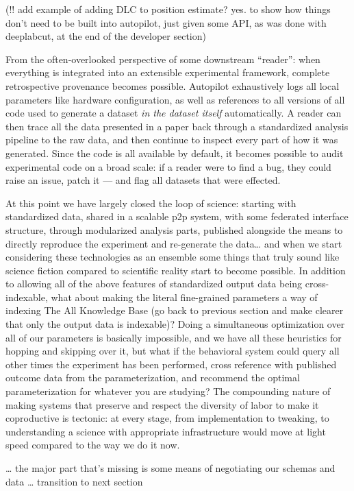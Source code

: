\documentclass[11pt]{article}
\begin{document}
\begin{multicols}{2}
(!! add example of adding DLC to position estimate? yes. to show how
things don't need to be built into autopilot, just given some API, as
was done with deeplabcut, at the end of the developer section)

From the often-overlooked perspective of some downstream ``reader'':
when everything is integrated into an extensible experimental framework,
complete retrospective provenance becomes possible. Autopilot
exhaustively logs all local parameters like hardware configuration, as
well as references to all versions of all code used to generate a
dataset \emph{in the dataset itself} automatically. A reader can then
trace all the data presented in a paper back through a standardized
analysis pipeline to the raw data, and then continue to inspect every
part of how it was generated. Since the code is all available by
default, it becomes possible to audit experimental code on a broad
scale: if a reader were to find a bug, they could raise an issue, patch
it --- and flag all datasets that were effected.

At this point we have largely closed the loop of science: starting with
standardized data, shared in a scalable p2p system, with some federated
interface structure, through modularized analysis parts, published
alongside the means to directly reproduce the experiment and re-generate
the data\ldots{} and when we start considering these technologies as an
ensemble some things that truly sound like science fiction compared to
scientific reality start to become possible. In addition to allowing all
of the above features of standardized output data being cross-indexable,
what about making the literal fine-grained parameters a way of indexing
The All Knowledge Base (go back to previous section and make clearer
that only the output data is indexable)? Doing a simultaneous
optimization over all of our parameters is basically impossible, and we
have all these heuristics for hopping and skipping over it, but what if
the behavioral system could query all other times the experiment has
been performed, cross reference with published outcome data from the
parameterization, and recommend the optimal parameterization for
whatever you are studying? The compounding nature of making systems that
preserve and respect the diversity of labor to make it coproductive is
tectonic: at every stage, from implementation to tweaking, to
understanding a science with appropriate infrastructure would move at
light speed compared to the way we do it now.

\ldots{} the major part that's missing is some means of negotiating our
schemas and data \ldots{} transition to next section


\end{multicols}
\end{document}
